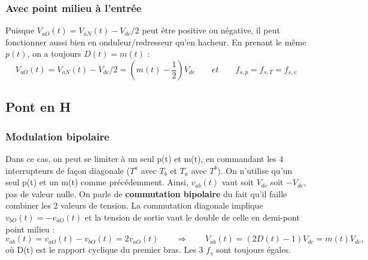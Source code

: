 		\subsubsection{Avec point milieu à l'entrée}
			Puisque $V_{aO}(t) = V_{aN}(t) - V_{dc}/2$ peut être positive ou négative, il peut fonctionner aussi bien en onduleur/redresseur qu'en hacheur. En prenant le même $p(t)$, on a toujours $D(t) = m(t)$ :
			\begin{equation}
				V_{aO}(t) = V_{aN}(t) - V_{dc}/2 = (m(t) - \frac{1}{2})V_{dc} \qquad et \qquad f_{s,p} = f_{s,T} =f_{s,v}
			\end{equation}
			
	\subsection{Pont en H}
		\subsubsection{Modulation bipolaire}
			Dans ce cas, on peut se limiter à un seul p(t) et m(t), en commandant les 4 interrupteurs de façon diagonale ($T^a$ avec $T_b$ et $T_a$ avec $T^b$). On n'utilise qu'un seul p(t) et un m(t) comme précédemment. Ainsi, $v_{ab}(t)$ vaut soit $V_{dc}$ soit $-V_{dc}$, pas de valeur nulle. On parle de \textbf{commutation bipolaire} du fait qu'il faille combiner les 2 valeurs de tension. La commutation diagonale implique $v_{bO}(t) = - v_{aO}(t)$ et la tension de sortie vaut le double de celle en demi-pont point milieu :
			\begin{equation}
				v_{ab}(t) = v_{aO}(t)-v_{bO}(t) = 2v_{aO}(t) \qquad \Rightarrow \qquad V_{ab}(t) = (2D(t)-1)V_{dc} = m(t) V_{dc},
			\end{equation}
			où D(t) est le rapport cyclique du premier bras. Les 3 $f_s$ sont toujours égales.
			
